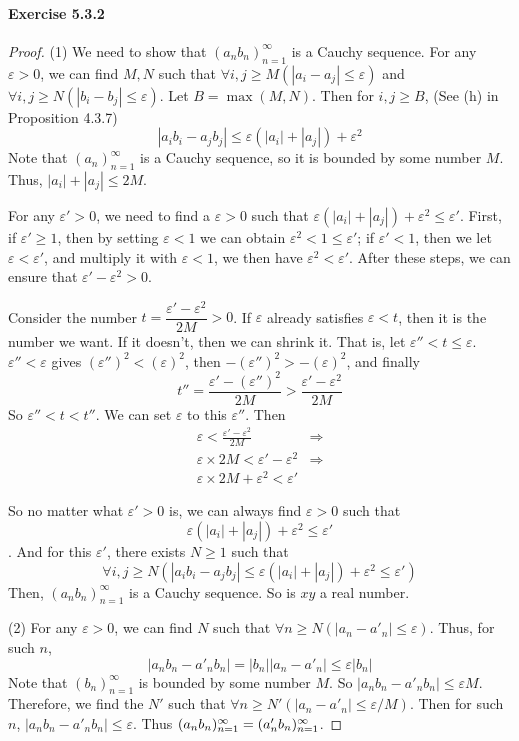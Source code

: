\paragraph{Exercise 5.3.2} \label{exercise5.3.2}
\begin{proof}
(1)
We need to show that $(a_nb_n)^\infty_{n=1}$ is a Cauchy sequence. For any $\varepsilon>0$, we can find $M,N$ such that 
$\forall i,j\geq M(|a_i-a_j| \leq \varepsilon)$ and $\forall i,j\geq N(|b_i-b_j| \leq \varepsilon)$. Let $B = \max{(M,N)}$. Then for 
$i,j \geq B$, (See (h) in Proposition 4.3.7)
\[
|a_ib_i - a_jb_j| \leq \varepsilon(|a_i| + |a_j|) + \varepsilon^2
\]
Note that $(a_n)^\infty_{n=1}$ is a Cauchy sequence, so it is bounded by some number $M$. Thus, 
$|a_i| + |a_j| \leq 2M$. 

For any $\varepsilon' >0$, we need to find a $\varepsilon >0$ such that 
$\varepsilon(|a_i| + |a_j|) + \varepsilon^2 \leq \varepsilon'$. First, if $\varepsilon' \geq 1$, then by 
setting $\varepsilon < 1$ we can obtain $\varepsilon^2 < 1 \leq \varepsilon'$; if $\varepsilon' < 1$, then we let $\varepsilon < \varepsilon'$, and multiply it with $\varepsilon < 1$, we then have 
$\varepsilon^2 < \varepsilon'$. After these steps, we can ensure that $\varepsilon' - \varepsilon^2>0$. 

Consider the number $t = \dfrac{\varepsilon' - \varepsilon^2}{2M}>0$. If $\varepsilon$ already satisfies 
$\varepsilon <t$, then it is the number we want. If it doesn't, then we can shrink it. That is, let
$\varepsilon'' < t \leq \varepsilon$. $\varepsilon'' < \varepsilon$ gives 
$(\varepsilon'')^2 < (\varepsilon)^2$, then $-(\varepsilon'')^2 > -(\varepsilon)^2$, and finally 
\[
t'' = \frac{\varepsilon' - (\varepsilon'')^2}{2M}>\frac{\varepsilon' - \varepsilon^2}{2M}
\]
So $\varepsilon'' < t < t''$. We can set $\varepsilon$ to this $\varepsilon''$. Then 
\begin{align*}
\varepsilon < \frac{\varepsilon' - \varepsilon^2}{2M} &\Longrightarrow \\
\varepsilon \times 2M < \varepsilon' - \varepsilon^2 &\Longrightarrow \\
\varepsilon \times 2M + \varepsilon^2 < \varepsilon'
\end{align*}

So no matter what $\varepsilon'>0$ is, we can always find $\varepsilon >0$ such that 
\[
\varepsilon(|a_i| + |a_j|) + \varepsilon^2 \leq \varepsilon'
\].
And for this $\varepsilon'$, there exists $N\geq 1$ such that 
\[
\forall i,j\geq N(|a_ib_i - a_jb_j| \leq \varepsilon(|a_i| + |a_j|) + \varepsilon^2 \leq \varepsilon')
\]
Then, $(a_nb_n)^\infty_{n=1}$ is a Cauchy sequence. So is $xy$ a real number.

(2)
For any $\varepsilon >0$, we can find $N$ such that $\forall n\geq N(|a_n-a'_n|\leq \varepsilon)$. Thus, for 
such $n$, 
\[
|a_nb_n - a'_nb_n| = |b_n||a_n - a'_n| \leq \varepsilon|b_n|
\]
Note that $(b_n)^\infty_{n=1}$ is bounded by some number $M$. So $|a_nb_n - a'_nb_n| \leq \varepsilon M$. 
Therefore, we find the $N'$ such that $\forall n\geq N'(|a_n-a'_n|\leq \varepsilon/M)$. Then for such $n$, 
$|a_nb_n - a'_nb_n| \leq \varepsilon$. Thus $(a_nb_n)^\infty_{n=1} = (a'_nb_n)^\infty_{n=1}$.
\end{proof}

